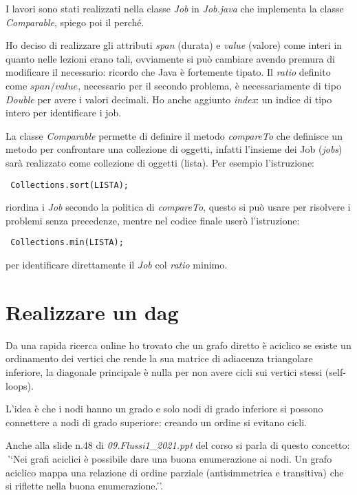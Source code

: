 \documentclass[12pt, letterpaper]{article}
\begin{document}
I lavori sono stati realizzati nella classe \textit{Job} in \textit{Job.java} che implementa la classe \textit{Comparable}, spiego poi il perché.

Ho deciso di realizzare gli attributi \textit{span} (durata) e \textit{value} (valore) come interi in quanto nelle lezioni erano tali, ovviamente si può cambiare avendo premura di modificare il necessario: ricordo che Java è fortemente tipato. Il \textit{ratio} definito come $span/value$, necessario per il secondo problema, è necessariamente di tipo \textit{Double} per avere i valori decimali.
Ho anche aggiunto \textit{index}: un indice di tipo intero per identificare i job.

La classe \textit{Comparable} permette di definire il metodo \textit{compareTo} che definisce un metodo per confrontare una collezione di oggetti, infatti l'insieme dei Job (\textit{jobs}) sarà realizzato come collezione di oggetti (lista).
Per esempio l'istruzione:\begin{verbatim} Collections.sort(LISTA); \end{verbatim} riordina i \textit{Job} secondo la politica di \textit{compareTo}, questo si può usare per risolvere i problemi senza precedenze, mentre nel codice finale userò l'istruzione:\begin{verbatim} Collections.min(LISTA); \end{verbatim} per identificare direttamente il \textit{Job} col \textit{ratio} minimo.

\section{Realizzare un dag}
 
Da una rapida ricerca online ho trovato che un grafo diretto è aciclico se esiste un ordinamento dei vertici che rende la sua matrice di adiacenza triangolare inferiore, la diagonale principale è nulla per non avere cicli sui vertici stessi (self-loops).\cite{dag-matrix}

L'idea è che i nodi hanno un grado e solo nodi di grado inferiore si possono connettere a nodi di grado superiore: creando un ordine si evitano cicli.

Anche alla slide n.48 di \textit{09.Flussi1\_2021.ppt} del corso si parla di questo concetto: \textit``Nei grafi aciclici è possibile dare una buona enumerazione ai nodi. Un grafo aciclico mappa una relazione di ordine parziale (antisimmetrica e transitiva) che si riflette nella buona enumerazione.''.
\end{document}
